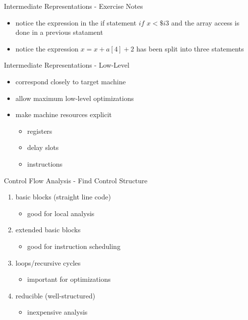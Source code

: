 \documentclass[mcgill,slideColor,colorBG,pdf]{prosper}
\begin{document}
\begin{slide} {Intermediate Representations - Exercise Notes}
\begin{itemize}
\item notice the expression in the if statement $if$ $x < \$i3$ and the array access is done in a previous statament
\item notice the expression $x = x + a[4] + 2$ has been split into three statements
\end{itemize}
\end{slide}

\begin{slide} {Intermediate Representations - Low-Level}
\begin{itemize}
\item correspond closely to target machine
\item allow maximum low-level optimizations
\item make machine resources explicit
\begin{itemize}
\item registers
\item delay slots
\item instructions
\end{itemize}
\end{itemize}
\end{slide}

\begin{slide} {Control Flow Analysis - Find Control Structure}
\begin{enumerate}
\item basic blocks (straight line code)
\begin{itemize}
\item good for local analysis
\end{itemize}
\item extended basic blocks
\begin{itemize}
\item good for instruction scheduling
\end{itemize}
\item loops/recursive cycles
\begin{itemize}
\item important for optimizations
\end{itemize}
\item reducible (well-structured)
\begin{itemize}
\item inexpensive analysis
\end{itemize}

\end{enumerate}
\end{slide}
\end{document}
